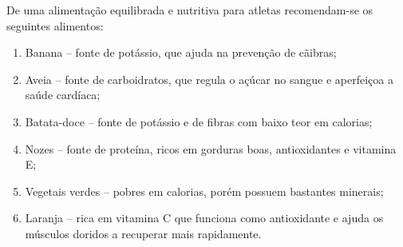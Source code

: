 \documentclass{report}
\begin{document}
 
    
    De uma alimentação equilibrada e nutritiva para atletas recomendam-se os seguintes alimentos:
    
    \renewcommand{\theenumi}{\alph {enumi}}
    \begin{enumerate}
        \item Banana – fonte de potássio, que ajuda na prevenção de cãibras;
        \item Aveia – fonte de carboidratos, que regula o açúcar no sangue e aperfeiçoa a saúde cardíaca;
        \item Batata-doce – fonte de potássio e de fibras com baixo teor em calorias;
        \item Nozes – fonte de proteína, ricos em gorduras boas, antioxidantes e vitamina E;
        \item Vegetais verdes – pobres em calorias, porém possuem bastantes minerais;
        \item Laranja – rica em vitamina C que funciona como antioxidante e ajuda os músculos doridos a recuperar mais rapidamente.
    \end{enumerate}
    
\end{document}

